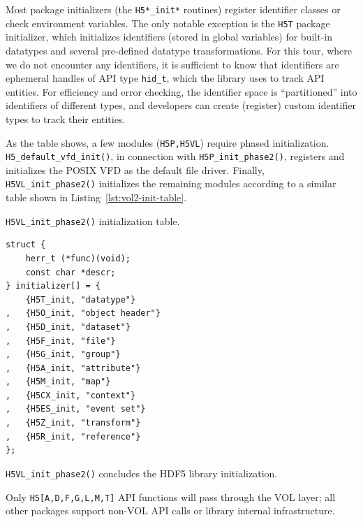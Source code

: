 Most package initializers (the \texttt{H5*\_init*} routines) register identifier classes or check environment variables. The only notable exception is the \texttt{H5T} package initializer, which initializes identifiers (stored in global variables) for built-in datatypes and several pre-defined datatype transformations. For this tour, where we do not encounter any identifiers, it is sufficient to know that identifiers are ephemeral handles of API type \texttt{hid\_t}, which the library uses to track API entities. For efficiency and error checking, the identifier space is ``partitioned'' into identifiers of different types, and developers can create (register) custom identifier types to track their entities.

As the table shows, a few modules (\texttt{H5P,H5VL}) require phased initialization. \texttt{H5\_default\_vfd\_init()}, in connection with \texttt{H5P\_init\_phase2()},  registers and initializes the POSIX VFD as the default file driver. Finally, \texttt{H5VL\_init\_phase2()} initializes the remaining modules according to a similar table shown in Listing~\ref{lst:vol2-init-table}.

\begin{listing}
\centering
\caption{\texttt{H5VL\_init\_phase2()} initialization table.}
\label{lst:vol2-init-table}
\begin{verbatim}
struct {
    herr_t (*func)(void);
    const char *descr;
} initializer[] = {
    {H5T_init, "datatype"}
,   {H5O_init, "object header"}
,   {H5D_init, "dataset"}
,   {H5F_init, "file"}
,   {H5G_init, "group"}
,   {H5A_init, "attribute"}
,   {H5M_init, "map"}
,   {H5CX_init, "context"}
,   {H5ES_init, "event set"}
,   {H5Z_init, "transform"}
,   {H5R_init, "reference"}
};
\end{verbatim}
\end{listing}

\texttt{H5VL\_init\_phase2()} concludes the HDF5 library initialization.

Only \texttt{H5[A,D,F,G,L,M,T]} API functions will pass through the VOL layer; all other packages support non-VOL API calls or library internal infrastructure.

\noindent{}

